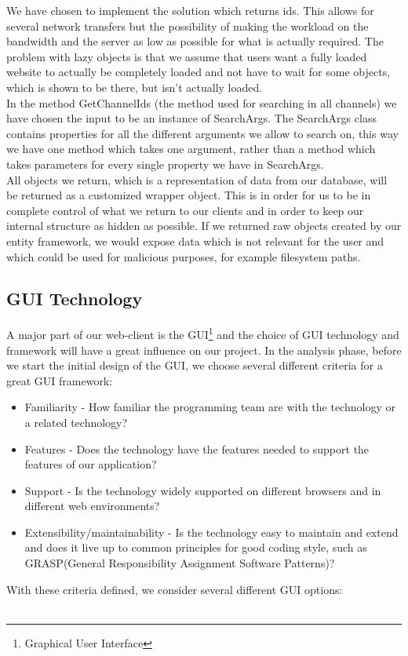 \documentclass[a4paper,11pt,report]{article}
\begin{document}
We have chosen to implement the solution which returns ids. This allows for several network transfers but the possibility of making the workload on the bandwidth and the server as low as possible for what is actually required. The problem with lazy objects is that we assume that users want a fully loaded website to actually be completely loaded and not have to wait for some objects, which is shown to be there, but isn't actually loaded. \\
In the method GetChannelIds (the method used for searching in all channels) we have chosen the input to be an instance of SearchArgs. The SearchArgs class contains properties for all the different arguments we allow to search on, this way we have one method which takes one argument, rather than a method which takes parameters for every single property we have in SearchArgs. \\
All objects we return, which is a representation of data from our database, will be returned as a customized wrapper object. This is in order for us to be in complete control of what we return to our clients and in order to keep our internal structure as hidden as possible. If we returned raw objects created by our entity framework, we would expose data which is not relevant for the user and which could be used for malicious purposes, for example filesystem paths.

\subsection{GUI Technology}
A major part of our web-client is the GUI\footnote{Graphical User Interface} and the choice of GUI technology and framework will have a great influence on our project. In the analysis phase, before we start the initial design of the GUI, we choose several different criteria for a great GUI framework:
\begin{itemize}
\item Familiarity - How familiar the programming team are with the technology or a related technology?
\item Features - Does the technology have the features needed to support the features of our application?
\item Support - Is the technology widely supported on different browsers and in different web environments?
\item Extensibility/maintainability - Is the technology easy to maintain and extend and does it live up to common principles for good coding style, such as GRASP(General Responsibility Assignment Software Patterns)?
\end{itemize}
With these criteria defined, we consider several different GUI options: \\ \\
\end{document}
